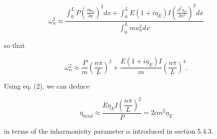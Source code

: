   $$\omega_n^2 \approx \dfrac{\int_0^L{P \left(\frac{\partial u_n}{\partial 
  x}\right)^2} dx + \int_0^L{E(1+i \eta_E) I \left(\frac{\partial^2 
  u_n}{\partial x^2}\right)^2} dx}{\int_0^L{m u_n^2} dx} \tag{3}$$ 

  so that 

  $$\omega_n^2 \approx \dfrac{P}{m} \left(\dfrac{n \pi}{L}\right)^2 + 
  \dfrac{E(1+i \eta_E)I}{m} \left(\dfrac{n \pi}{L}\right)^4 . \tag{4}$$ 

  Using eq. (2), we can deduce 

  $$\eta_{bend} \approx \dfrac{E \eta_E I \left(\dfrac{n \pi}{L}\right)^2}{P} = 
  2 \alpha n^2 \eta_E$$ 

  in terms of the inharmonicity parameter $\alpha$ introduced in section 5.4.3. 